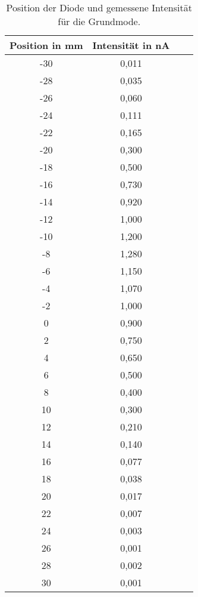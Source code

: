     \begin{table}
      \centering
      \begin{tabular}{c c c c}
        \toprule
        Position in mm & Intensität in nA\\
        \midrule
        -30  & 0,011\\
        -28  & 0,035\\
        -26  & 0,060\\
        -24  & 0,111\\
        -22  & 0,165\\
        -20  & 0,300\\
        -18  & 0,500\\
        -16  & 0,730\\
        -14  & 0,920\\
        -12  & 1,000\\
        -10  & 1,200\\
         -8  & 1,280\\
         -6  & 1,150\\
         -4  & 1,070\\
         -2  & 1,000\\
          0  & 0,900\\
          2  & 0,750\\
          4  & 0,650\\
          6  & 0,500\\
          8  & 0,400\\
         10  & 0,300\\
         12  & 0,210\\
         14  & 0,140\\
         16  & 0,077\\
         18  & 0,038\\
         20  & 0,017\\
         22  & 0,007\\
         24  & 0,003\\
         26  & 0,001\\
         28  & 0,002\\
         30  & 0,001\\
        \bottomrule
      \end{tabular}
      \caption{Position der Diode und gemessene Intensität für die Grundmode.}
      \label{tab:grundmode}
    \end{table}


